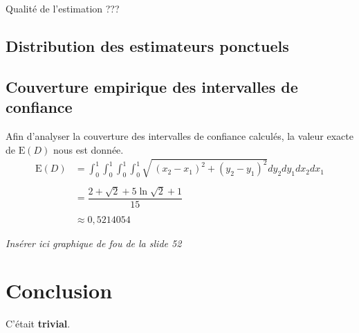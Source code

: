 \documentclass[paper=a4, fontsize=11pt]{scrartcl}
\begin{document}
Qualité de l'estimation ???

\subsection{Distribution des estimateurs ponctuels }

\subsection{Couverture empirique des intervalles de confiance}

Afin d'analyser la couverture des intervalles de confiance calculés, la valeur exacte de $\text{E}(D)$ nous est donnée.
\begin{align*}
  \text{E}(D) &= \int _0^1\int _0^1\int _0^1\int _0^1\sqrt{\:\left(x_2-x_1\right)^2+\left(y_2-y_1\right)^2}dy_2dy_1dx_2dx_1 \\ \\
  &= \dfrac{2 + \sqrt{2} + 5\ln{\sqrt{2} + 1}}{15} \\ \\
  &\approx 0,5214054
\end{align*}

\textit{Insérer ici graphique de fou de la slide 52}

\section{Conclusion}

C'était \textbf{trivial}.
\end{document}
